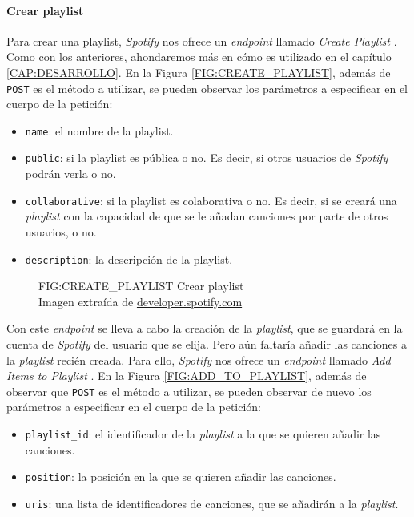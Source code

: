 \paragraph{Crear playlist\label{subsec:crear_playlist}}

Para crear una playlist, \textit{Spotify} nos ofrece un \textit{endpoint} llamado \textit{Create Playlist} \cite{create_playlist}.
Como con los anteriores, ahondaremos más en cómo es utilizado en el capítulo \ref{CAP:DESARROLLO}. En la Figura \ref{FIG:CREATE_PLAYLIST}, además de
\texttt{POST} es el método a utilizar, se pueden observar los parámetros a especificar en el cuerpo de la petición:

\begin{itemize}
  \item \texttt{name}: el nombre de la playlist.
  \item \texttt{public}: si la playlist es pública o no. Es decir, si otros usuarios de \textit{Spotify} podrán verla o no.
  \item \texttt{collaborative}: si la playlist es colaborativa o no. Es decir, si se creará una \textit{playlist} con la capacidad
  de que se le añadan canciones por parte de otros usuarios, o no.
  \item \texttt{description}: la descripción de la playlist.
\end{itemize}

\begin{figure}[Crear playlist]{FIG:CREATE_PLAYLIST}
    {Crear playlist \\
    {\scriptsize Imagen extraída de \href{https://developer.spotify.com/documentation/web-api/reference/create-playlist}{developer.spotify.com}}}
\end{figure}

Con este \textit{endpoint} se lleva a cabo la creación de la \textit{playlist}, que se guardará en la cuenta de \textit{Spotify} del usuario que
se elija. Pero aún faltaría añadir las canciones a la \textit{playlist} recién creada. Para ello, \textit{Spotify} nos ofrece un \textit{endpoint} llamado
\textit{Add Items to Playlist} \cite{add_to_playlist}. En la Figura \ref{FIG:ADD_TO_PLAYLIST}, además de observar que \texttt{POST} es el método a utilizar,
se pueden observar de nuevo los parámetros a especificar en el cuerpo de la petición:

\begin{itemize}
  \item \texttt{playlist\_id}: el identificador de la \textit{playlist} a la que se quieren añadir las canciones.
  \item \texttt{position}: la posición en la que se quieren añadir las canciones.
  \item \texttt{uris}: una lista de identificadores de canciones, que se añadirán a la \textit{playlist}.
\end{itemize}

